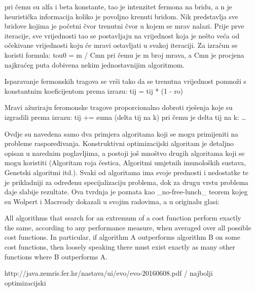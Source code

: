 pri čemu su alfa i beta konstante, tao je intenzitet fermona na bridu, a n je heuristička informacija koliko je povoljno krenuti bridom. Nik predstavlja
sve bridove kojima je početni čvor trenutni čvor u kojem se mrav nalazi. Prije prve iteracije, sve vrijednosti tao se postavljaju na
vrijednost koja je nešto veća od očekivane vrijednosti koju će mravi ostavljati u svakoj iteraciji. Za izračun se koristi formula:
tou0 = m / Cmn
pri čemu je m broj mrava, a Cmn je procjena najkraćeg puta dobivena nekim jednostavnijim algoritmom.

Isparavanje fermonskih tragova se vrši tako da se trenutna vrijednost pomnoži s konstantnim koeficijentom prema izrazu:
tij = tij * (1 - ro)

Mravi ažuriraju feromonske tragove proporcionalno dobroti rješenja koje su izgradili prema izrazu:
tij += suma (delta tij na k)
pri čemu je delta tij na k:
\dots




Ovdje su navedena samo dva primjera algoritama koji se mogu primijeniti na probleme raspoređivanja. Konstruktivni optimizacijski
algoritam je detaljno opisan u narednim poglavljima, a postoji još mnoštvo drugih algoritama koji se mogu koristiti (Algoritam roja
čestica, Algoritmi umjetnih imunoloških sustava, Genetski algoritmi itd.). Svaki od algoritama ima svoje prednosti i nedostatke te je
prikladniji za određenu specijalizaciju problema, dok za drugu vrstu problema daje slabije rezultate. Ova tvrdnja je poznata kao
_no-free-lunch_ teorem kojeg su Wolpert i Macready dokazali u svojim radovima, a u originalu glasi:

All algorithms that search for an extremum of a cost function perform exactly the same, according to any performance measure,
when averaged over all possible cost functions. In particular, if algorithm A outperforms algorithm B on some cost functions, then
loosely speaking there must exist exactly as many other functions where B outperforms A.

http://java.zemris.fer.hr/nastava/ui/evo/evo-20160608.pdf / najbolji optimizacijski